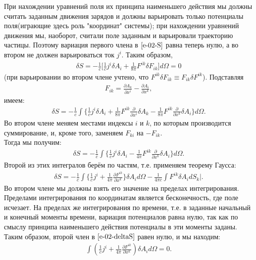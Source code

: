 \documentclass[__main__.tex]{subfiles}
\begin{document}
При нахождении уравнений поля их принципа наименьшего действия мы должны считать заданным движения зарядов и должны варьировать только потенциалы поля(играющие здесь роль "координат" системы); при нахождении уравнений движения мы, наоборот, считали поле заданным и варьировали траекторию частицы.
Поэтому вариация первого члена в $\ref{e-02-S}$ равна теперь нулю, а во втором не должен варьироваться ток $j^i$. Таким образом, 
\begin{gather*}
	\delta S = -\frac{1}{c}\big[\frac{1}{c}j^i\delta A_i + \frac{1}{8\pi}F^{ik}\delta F_{ik}\big]d\Omega = 0
\end{gather*}
(при варьировании во втором члене учтено, что $F^{ik}\delta F_{ik} \equiv F_{ik}\delta F^{ik}$). Подставляя
\begin{gather*}
	F_{ik} = \frac{\partial A_k}{\partial x^i} - \frac{\partial A_i}{\partial x^k},
\end{gather*}
имеем:
\begin{gather*}
	\delta S = -\frac{1}{c}\int \big\{\frac{1}{c}j^i\delta A_i + \frac{1}{8\pi}F^{ik}\frac{\partial}{\partial x^i}\delta A_k - \frac{1}{8\pi}F^{ik}\frac{\partial}{\partial x^k}\delta A_i\big\}d\Omega.
\end{gather*}
Во втором члене меняем местами индексы $i$ и $k$, по которым производится суммирование, и, кроме того, заменяем $F_{ki}$ на $-F_{ik}$.\\
Тогда мы получим:
\begin{gather*}
	\delta S = -\frac{1}{c}\int\big\{\frac{1}{c}j^i\delta A_i - \frac{1}{4\pi}F^{ik}\frac{\partial}{\partial x^k}\delta A_i\big\}d\Omega.
\end{gather*}
Второй из этих интегралов берём по частям, т.е. применяем теорему Гаусса:
\begin{gather}
	\label{e-02-deltaS}
	\delta S = -\frac{1}{c}\int\big\{\frac{1}{c}j^i + \frac{1}{4\pi}\frac{\partial F^{ik}}{\partial x^k}\big\}\delta A_id\Omega - \frac{1}{4\pi c}\int F^{ik}\delta A_idS_k\big|.
\end{gather}
Во втором члене  мы должны взять его значение на пределах интегрирования. Пределами интегрирования по координатам является бесконечность, где поле исчезает. На пределах же интегрирования по времени, т.е. в заданные начальный и конечный моменты времени, вариация потенциалов равна нулю, так как по смыслу принципа наименьшего действия потенциалы в эти моменты заданы. Таким образом, второй член в $\ref{e-02-deltaS}$ равен нулю, и мы находим:
\begin{gather*}
	\int(\frac{1}{c}j^i + \frac{1}{4\pi}\frac{\partial F^{ik}}{\partial x^k})\delta A_id\Omega = 0.
\end{gather*}
\end{document}
